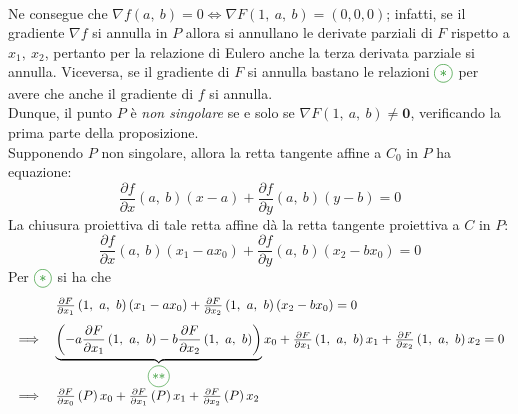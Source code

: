 \begin{demonstration}
\begin{gather*}
		\end{gather*}
	Ne consegue che $\nabla f\left(a,\ b\right)=0 \iff  \nabla F\left(1,\ a,\ b\right)=(0,0,0)$; infatti, se il gradiente $\nabla f$ si annulla in $P$ allora si annullano le derivate parziali di $F$ rispetto a $x_1,\ x_2$, pertanto per la relazione di Eulero anche la terza derivata parziale si annulla. Viceversa, se il gradiente di $F$ si annulla bastano le relazioni $\textcolor{green}{\circled{\ast}}$ per avere che anche il gradiente di $f$ si annulla.\\
	Dunque, il punto $P$ è \textit{non singolare} se e solo se $\nabla F\left(1,\ a,\ b\right)\neq \mathbf{0}$, verificando la prima parte della proposizione.\\
	Supponendo $P$ non singolare, allora la retta tangente affine a $C_0$ in $P$ ha equazione:
	\begin{equation*}
		\frac{\partial{f}}{\partial{x}}\left(a,\ b\right)(x-a) + \frac{\partial{f}}{\partial{y}}\left(a,\ b\right)(y-b)=0
	\end{equation*}
	La chiusura proiettiva di tale retta affine dà la retta tangente proiettiva a $C$ in $P$:
	\begin{equation*}
		\frac{\partial{f}}{\partial{x}}\left(a,\ b\right)(x_1-ax_0) + \frac{\partial{f}}{\partial{y}}\left(a,\ b\right)(x_2-bx_0)=0 
	\end{equation*}
	Per $\textcolor{green}{\circled{\ast}}$ si ha che
		\begin{equation*}
			\begin{array}{ll}
				&\frac{\partial{F}}{\partial{x_1}}\left(1,\ a,\ b\right)(x_1-ax_0) + \frac{\partial{F}}{\partial{x_2}}\left(1,\ a,\ b\right)(x_2-bx_0)=0 \\[3mm]
				\implies & \underbrace{ \left( -a\frac{\partial{F}}{\partial{x_1}}\left(1,\ a,\ b\right) -b \frac{\partial{F}}{\partial{x_2}}\left(1,\ a,\ b\right) \right)}_{\textcolor{green}{\circled{\ast\ast}}}  x_0 + \frac{\partial{F}}{\partial{x_1}}\left(1,\ a,\ b\right) x_1 + \frac{\partial{F}}{\partial{x_2}}\left(1,\ a,\ b\right) x_2=0 \\
				\implies & \frac{\partial{F}}{\partial{x_0}}\left(P\right) x_0 + \frac{\partial{F}}{\partial{x_1}}\left(P\right) x_1 + \frac{\partial{F}}{\partial{x_2}}\left(P\right) x_2
			\end{array}
		\end{equation*}
\end{demonstration}

